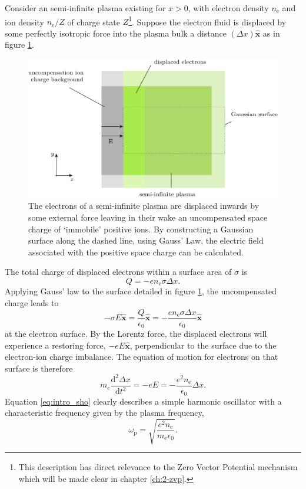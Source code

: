 Consider an semi-infinite plasma existing for $x>0$, with electron density $n_\mathrm{e}$ and ion density $n_\mathrm{e}/Z$ of charge state $Z$\footnote{This description has direct relevance to the Zero Vector Potential mechanism which will be made clear in chapter \ref{ch:2-zvp}.}. Suppose the electron fluid is displaced by some perfectly isotropic force into the plasma bulk a distance $(\Delta x) \hat{\mathbf{x}}$ as in figure \ref{fig:introplasmafrequency}. 
\begin{figure}
	\centering
	\includegraphics[width=0.7\linewidth]{figures/intro/intro_plasma_frequency}
	\caption[Diagram to illustrate the derivation of the plasma frequency.]{The electrons of a semi-infinite plasma are displaced inwards by some external force leaving in their wake an uncompensated space charge of `immobile' positive ions. By constructing a Gaussian surface along the dashed line, using Gauss' Law, the electric field associated with the positive space charge can be calculated.}
	\label{fig:introplasmafrequency}
\end{figure}
The total charge of displaced electrons within a surface area of $\sigma$ is 
\begin{equation}\label{eq:intro_Q}
	Q = -en_\mathrm{e}\sigma\Delta x.
\end{equation}
Applying Gauss' law to the surface detailed in figure \ref{fig:introplasmafrequency}, the uncompensated charge leads to 
\begin{equation}\label{eq:intro_E}
	-\sigma E\hat{\mathbf{x}}= \frac{Q}{\epsilon_0}\hat{\mathbf{x}} = -\frac{en_\mathrm{e}\sigma\Delta x}{\epsilon_0}\hat{\mathbf{x}}
\end{equation}
at the electron surface. By the Lorentz force, the displaced electrons will experience a restoring force, $-eE\hat{\mathbf{x}}$, perpendicular to the surface due to the electron-ion charge imbalance. The equation of motion for electrons on that surface is therefore
\begin{equation}\label{eq:intro_sho}
	m_e\frac{\mathrm{d}^2\Delta x}{\mathrm{d}t^2} = -eE = -\frac{e^2n_\mathrm{e}}{\epsilon_0}\Delta x.
\end{equation}
Equation \ref{eq:intro_sho} clearly describes a simple harmonic oscillator with a characteristic frequency given by the plasma frequency,
\begin{equation}
	\omega_\mathrm{p} = \sqrt{\frac{e^2n_\mathrm{e}}{m_\mathrm{e} \epsilon_0}}.
\end{equation}



